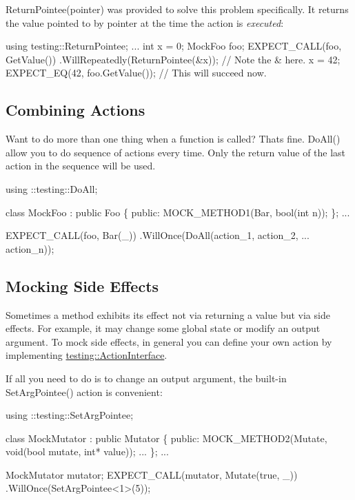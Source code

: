 {\ttfamily Return\+Pointee(pointer)} was provided to solve this problem specifically. It returns the value pointed to by {\ttfamily pointer} at the time the action is {\itshape executed}\+:


\begin{DoxyCode}
using testing::ReturnPointee;
...
  int x = 0;
  MockFoo foo;
  EXPECT\_CALL(foo, GetValue())
      .WillRepeatedly(ReturnPointee(&x));  // Note the & here.
  x = 42;
  EXPECT\_EQ(42, foo.GetValue());  // This will succeed now.
\end{DoxyCode}


\subsection*{Combining Actions}

Want to do more than one thing when a function is called? That\textquotesingle{}s fine. {\ttfamily Do\+All()} allow you to do sequence of actions every time. Only the return value of the last action in the sequence will be used.


\begin{DoxyCode}
using ::testing::DoAll;

class MockFoo : public Foo \{
 public:
  MOCK\_METHOD1(Bar, bool(int n));
\};
...

  EXPECT\_CALL(foo, Bar(\_))
      .WillOnce(DoAll(action\_1,
                      action\_2,
                      ...
                      action\_n));
\end{DoxyCode}


\subsection*{Mocking Side Effects}

Sometimes a method exhibits its effect not via returning a value but via side effects. For example, it may change some global state or modify an output argument. To mock side effects, in general you can define your own action by implementing {\ttfamily \hyperlink{classtesting_1_1_action_interface}{testing\+::\+Action\+Interface}}.

If all you need to do is to change an output argument, the built-\/in {\ttfamily Set\+Arg\+Pointee()} action is convenient\+:


\begin{DoxyCode}
using ::testing::SetArgPointee;

class MockMutator : public Mutator \{
 public:
  MOCK\_METHOD2(Mutate, void(bool mutate, int* value));
  ...
\};
...

  MockMutator mutator;
  EXPECT\_CALL(mutator, Mutate(true, \_))
      .WillOnce(SetArgPointee<1>(5));
\end{DoxyCode}


